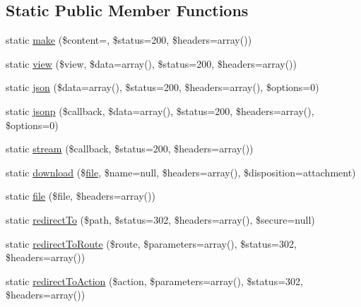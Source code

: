 \subsection*{Static Public Member Functions}
\begin{DoxyCompactItemize}
\item 
static \mbox{\hyperlink{class_illuminate_1_1_support_1_1_facades_1_1_response_ace4ab69686b08e356cd4305c9c4a5dbf}{make}} (\$content=\textquotesingle{}\textquotesingle{}, \$status=200, \$headers=array())
\item 
static \mbox{\hyperlink{class_illuminate_1_1_support_1_1_facades_1_1_response_a779627335e2e4bbb7858382cd706c00e}{view}} (\$view, \$data=array(), \$status=200, \$headers=array())
\item 
static \mbox{\hyperlink{class_illuminate_1_1_support_1_1_facades_1_1_response_a2ea308811b844bd1aa314083c14c8605}{json}} (\$data=array(), \$status=200, \$headers=array(), \$options=0)
\item 
static \mbox{\hyperlink{class_illuminate_1_1_support_1_1_facades_1_1_response_ae3af25f8ecea63cc6d2bbdb3b4faa656}{jsonp}} (\$callback, \$data=array(), \$status=200, \$headers=array(), \$options=0)
\item 
static \mbox{\hyperlink{class_illuminate_1_1_support_1_1_facades_1_1_response_aa2886263a826cf6d6481b5affc009656}{stream}} (\$callback, \$status=200, \$headers=array())
\item 
static \mbox{\hyperlink{class_illuminate_1_1_support_1_1_facades_1_1_response_a8496fd2c8b9553a89fde5d7b0faefce3}{download}} (\$\mbox{\hyperlink{class_illuminate_1_1_support_1_1_facades_1_1_response_a0791c3f7a4abd07bc240d6734d9ebbfe}{file}}, \$name=null, \$headers=array(), \$disposition=\textquotesingle{}attachment\textquotesingle{})
\item 
static \mbox{\hyperlink{class_illuminate_1_1_support_1_1_facades_1_1_response_a0791c3f7a4abd07bc240d6734d9ebbfe}{file}} (\$file, \$headers=array())
\item 
static \mbox{\hyperlink{class_illuminate_1_1_support_1_1_facades_1_1_response_a39a92b65c6598c8e72cf1c9dbad5cad1}{redirect\+To}} (\$path, \$status=302, \$headers=array(), \$secure=null)
\item 
static \mbox{\hyperlink{class_illuminate_1_1_support_1_1_facades_1_1_response_a3c4ceb412071ae0fe5d3fe1ce611a2db}{redirect\+To\+Route}} (\$route, \$parameters=array(), \$status=302, \$headers=array())
\item 
static \mbox{\hyperlink{class_illuminate_1_1_support_1_1_facades_1_1_response_af2811d5e6a939fbf613802bf656d9dd4}{redirect\+To\+Action}} (\$action, \$parameters=array(), \$status=302, \$headers=array())

\end{DoxyCompactItemize}
